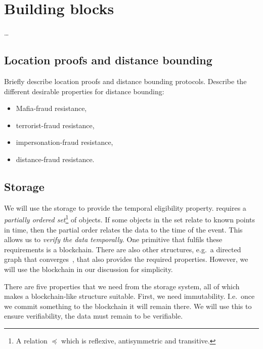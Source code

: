 \section{Building blocks}%
\label{Primitives}\label{BuildingBlocks}

\dots



%


\subsection{Location proofs and distance bounding}

Briefly describe location proofs and distance bounding protocols.
Describe the different desirable properties for distance bounding:
\begin{itemize}
  \item Mafia-fraud resistance,
  \item terrorist-fraud resistance,
  \item impersonation-fraud resistance,
  \item distance-fraud resistance.
\end{itemize}

\subsection{Storage}%
\label{StorageProperties}

We will use the storage to provide the temporal eligibility property.
 requires a \emph{partially ordered 
  set}\footnote{%
  A relation \(\preceq\) which is reflexive, antisymmetric and transitive.
} of objects.
If some objects in the set relate to known points in time, then the partial 
order relates the data to the time of the event.
This allows us to \emph{verify the data temporally}.
One primitive that fulfils these requirements is a blockchain.
There are also other structures, e.g.\ a directed graph that 
converges~\cite{BlockchainFreeCryptocurrencies}, that also provides the required 
properties.
However, we will use the blockchain in our discussion for simplicity.

There are five properties that we need from the storage system, all of which 
makes a blockchain-like structure suitable.
First, we need immutability.
I.e.\ once we commit something to the blockchain it will remain there.
We will use this to ensure verifiability, the data must remain to be verifiable.

